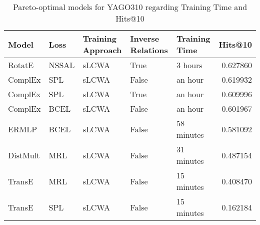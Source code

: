 \begin{table}
\centering
\caption{Pareto-optimal models for YAGO310 regarding Training Time and Hits@10}
\begin{tabular}{lllllr}
\toprule
    Model &   Loss & Training Approach & Inverse Relations & Training Time &   Hits@10 \\
\midrule
   RotatE &  NSSAL &             sLCWA &              True &       3 hours &  0.627860 \\
  ComplEx &    SPL &             sLCWA &             False &       an hour &  0.619932 \\
  ComplEx &    SPL &             sLCWA &              True &       an hour &  0.609996 \\
  ComplEx &   BCEL &             sLCWA &             False &       an hour &  0.601967 \\
    ERMLP &   BCEL &             sLCWA &             False &    58 minutes &  0.581092 \\
 DistMult &    MRL &             sLCWA &             False &    31 minutes &  0.487154 \\
   TransE &    MRL &             sLCWA &             False &    15 minutes &  0.408470 \\
   TransE &    SPL &             sLCWA &             False &    15 minutes &  0.162184 \\
\bottomrule
\end{tabular}
\end{table}


